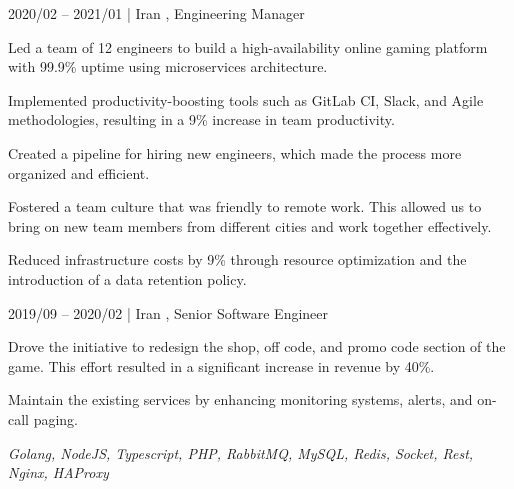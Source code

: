     \begin{twocolentry}{2020/02 -- 2021/01 | Iran}
        , Engineering Manager
    \end{twocolentry}
    \begin{onecolentry}
        \begin{highlights}
            \item Led a team of 12 engineers to build a high-availability online gaming platform with 99.9\% uptime using microservices architecture.
            \item Implemented productivity-boosting tools such as GitLab CI, Slack, and Agile methodologies, resulting in a 9\% increase in team productivity.
            \item Created a pipeline for hiring new engineers, which made the process more organized and efficient.
            \item Fostered a team culture that was friendly to remote work. This allowed us to bring on new team members from different cities and work together effectively.
            \item Reduced infrastructure costs by 9\% through resource optimization and the introduction of a data retention policy.
        \end{highlights}
    \end{onecolentry}
    \begin{twocolentry}{2019/09 -- 2020/02 | Iran}
        , Senior Software Engineer
    \end{twocolentry}
    \begin{onecolentry}
        \begin{highlights}
            \item Drove the initiative to redesign the shop, off code, and promo code section of the game. This effort resulted in a significant increase in revenue by 40\%.
            \item Maintain the existing services by enhancing monitoring systems, alerts, and on-call paging.
        \end{highlights}
        \textit{Golang, NodeJS, Typescript, PHP, RabbitMQ, MySQL, Redis, Socket, Rest, Nginx, HAProxy}
    \end{onecolentry}
    \vspace{0.3cm}


